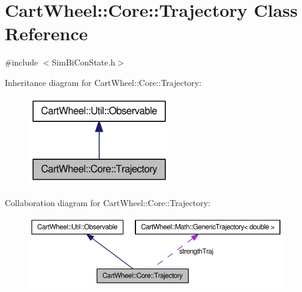 \hypertarget{classCartWheel_1_1Core_1_1Trajectory}{
\section{CartWheel::Core::Trajectory Class Reference}
\label{classCartWheel_1_1Core_1_1Trajectory}
}


{\ttfamily \#include $<$SimBiConState.h$>$}



Inheritance diagram for CartWheel::Core::Trajectory:\nopagebreak
\begin{figure}[H]
\begin{center}
\leavevmode
\includegraphics[width=176pt]{classCartWheel_1_1Core_1_1Trajectory__inherit__graph}
\end{center}
\end{figure}


Collaboration diagram for CartWheel::Core::Trajectory:\nopagebreak
\begin{figure}[H]
\begin{center}
\leavevmode
\includegraphics[width=400pt]{classCartWheel_1_1Core_1_1Trajectory__coll__graph}
\end{center}
\end{figure}
